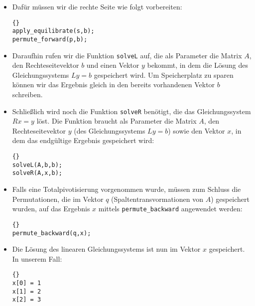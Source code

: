 \documentclass[a4paper,11pt]{article}
\theoremstyle{definition}
\begin{document}
\begin{itemize}
    \item Dafür müssen wir die rechte Seite wie folgt vorbereiten:
{\footnotesize{\begin{lstlisting}{}
apply_equilibrate(s,b);
permute_forward(p,b);
\end{lstlisting}}}
    \item Daraufhin rufen wir die Funktion \lstinline{solveL} auf, die als Parameter die Matrix $A$, den Rechteseitevektor $b$ und einen Vektor $y$ bekommt, in dem die Lösung des Gleichungssystems $Ly=b$ gespeichert wird. Um Speicherplatz zu sparen können wir das Ergebnis gleich in den bereits vorhandenen Vektor $b$ schreiben.
    \item Schließlich wird noch die Funktion \lstinline{solveR} benötigt, die das Gleichungssystem $Rx=y$ löst. Die Funktion braucht als Parameter die Matrix $A$, den Rechteseitevektor $y$ (des Gleichungssystems $Ly=b$) sowie den Vektor $x$, in dem das endgültige Ergebnis gespeichert wird:
    {\footnotesize{\begin{lstlisting}{}
solveL(A,b,b);
solveR(A,x,b);
        \end{lstlisting}}}
    \item Falls eine Totalpivotisierung vorgenommen wurde, müssen zum Schluss die Permutationen, die im Vektor $q$ (Spaltentransvormationen von $A$) gespeichert wurden, auf das Ergebnis $x$ mittels \lstinline{permute_backward} angewendet werden:
    {\footnotesize{\begin{lstlisting}{}
permute_backward(q,x);
        \end{lstlisting}}}
    \item Die Lösung des linearen Gleichungssystems ist nun im Vektor $x$ gespeichert. In unserem Fall:
    {\footnotesize{\begin{lstlisting}{}
x[0] = 1
x[1] = 2
x[2] = 3
        \end{lstlisting}}}
  \end{itemize}
\end{document}
